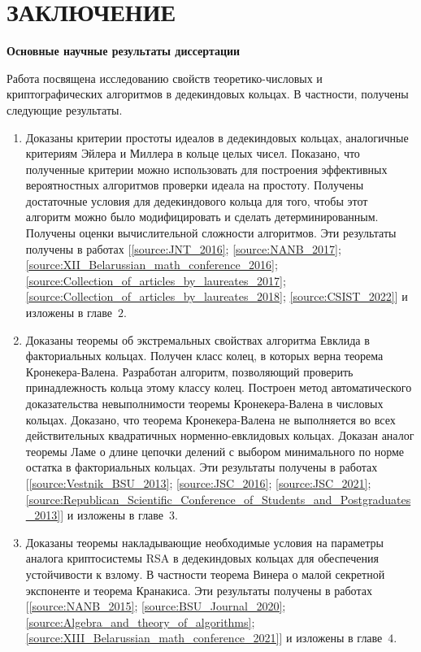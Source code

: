 \documentclass[_00_autoref.tex]{subfiles}
\begin{document}
{\let\clearpage\relax\vspace{2.2ex}
\chapter*{\MakeUppercase{ЗАКЛЮЧЕНИЕ}}\vspace{-3ex}}

\centerline{\textbf{Основные научные результаты диссертации}}

Работа посвящена исследованию свойств теоретико-числовых и криптографических алгоритмов в дедекиндовых кольцах.
В частности, получены следующие результаты.
\begin{enumerate}
    \item Доказаны критерии простоты идеалов в дедекиндовых кольцах, аналогичные критериям Эйлера и Миллера в кольце целых чисел.
    Показано, что полученные критерии можно использовать для построения эффективных вероятностных алгоритмов проверки идеала на простоту.
    Получены достаточные условия для дедекиндового кольца для того, чтобы этот алгоритм можно было модифицировать и сделать детерминированным.
    Получены оценки вычислительной сложности алгоритмов.
    Эти результаты получены в работах [\ref{source:JNT_2016}; \ref{source:NANB_2017}; \ref{source:XII_Belarussian_math_conference_2016}; \ref{source:Collection_of_articles_by_laureates_2017}; \ref{source:Collection_of_articles_by_laureates_2018}; \ref{source:CSIST_2022}] и изложены в главе~$2$.

    \item Доказаны теоремы об экстремальных свойствах алгоритма Евклида в факториальных кольцах.
    Получен класс колец, в которых верна теорема Кронекера-Валена.
    Разработан алгоритм, позволяющий проверить принадлежность кольца этому классу колец.
    Построен метод автоматического доказательства невыполнимости теоремы Кронекера-Валена в числовых кольцах.
    Доказано, что теорема Кронекера-Валена не выполняется во всех действительных квадратичных норменно-евклидовых кольцах.
    Доказан аналог теоремы Ламе о длине цепочки делений с выбором минимального по норме остатка в факториальных кольцах.
    Эти результаты получены в работах [\ref{source:Vestnik_BSU_2013}; \ref{source:JSC_2016}; \ref{source:JSC_2021}; \ref{source:Republican_Scientific_Conference_of_Students_and_Postgraduates_2013}] и изложены в главе~$3$.

    \item Доказаны теоремы накладывающие необходимые условия на параметры аналога криптосистемы RSA в дедекиндовых кольцах для обеспечения устойчивости к взлому.
    В частности теорема Винера о малой секретной экспоненте и теорема Кранакиса.
    Эти результаты получены в работах [\ref{source:NANB_2015}; \ref{source:BSU_Journal_2020}; \ref{source:Algebra_and_theory_of_algorithms}; \ref{source:XIII_Belarussian_math_conference_2021}] и изложены в главе~$4$.
\end{enumerate}
\end{document}
